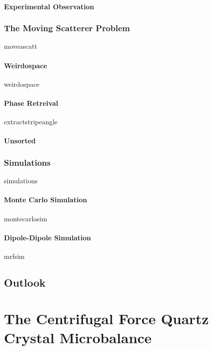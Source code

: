 \documentclass[12pt,a4paper,titlepage,onecolumn]{report}
\begin{document}
\subsection{Experimental Observation}
\section{The Moving Scatterer Problem}
{moveascatt}
\subsection{Weirdospace}
{weirdospace}
\subsection{Phase Retreival}
{extractstripeangle}
\subsection{Unsorted}
\section{Simulations}
{simulations}
\subsection{Monte Carlo Simulation}\label{sec:montecarlo}
{montecarlosim}
\subsection{Dipole-Dipole Simulation}\label{sec:mrfsim}
{mrfsim}
\chapter{Outlook}\label{ch:outlook}

\part{The Centrifugal Force Quartz Crystal Microbalance}\label{part:qcm}
\end{document}
